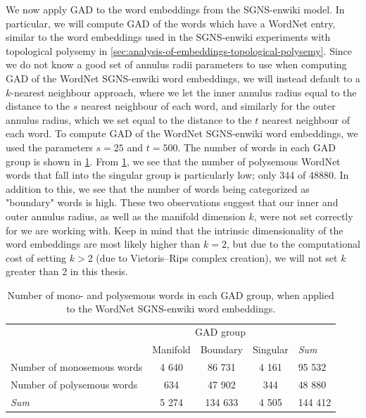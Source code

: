 We now apply GAD to the word embeddings from the SGNS-enwiki model. In particular, we will compute GAD of the words which have a WordNet entry, similar to the word embeddings used in the SGNS-enwiki experiments with topological polysemy in \cref{sec:analysis-of-embeddings-topological-polysemy}. Since we do not know a good set of annulus radii parameters to use when computing GAD of the WordNet SGNS-enwiki word embeddings, we will instead default to a $k$-nearest neighbour approach, where we let the inner annulus radius equal to the distance to the $s$ nearest neighbour of each word, and similarly for the outer annulus radius, which we set equal to the distance to the $t$ nearest neighbour of each word. To compute GAD of the WordNet SGNS-enwiki word embeddings, we used the parameters $s=25$ and $t=500$. The number of words in each GAD group is shown in \cref{table:number-of-words-gad-polysemous-sgns-enwiki-wordnet}. From \cref{table:number-of-words-gad-polysemous-sgns-enwiki-wordnet}, we see that the number of polysemous WordNet words that fall into the singular group is particularly low; only 344 of 48880. In addition to this, we see that the number of words being categorized as "boundary" words is high. These two observations suggest that our inner and outer annulus radius, as well as the manifold dimension $k$, were not set correctly for we are working with. Keep in mind that the intrinsic dimensionality of the word embeddings are most likely higher than $k=2$, but due to the computational cost of setting $k > 2$ (due to Vietoris–Rips complex creation), we will not set $k$ greater than 2 in this thesis.
\begin{table}[H]
    \centering
    \begin{tabular}{@{}lcccl@{}}
    \toprule
    \multicolumn{1}{c}{}       & \multicolumn{3}{c}{GAD group}  & \multicolumn{1}{l}{} \\ \cmidrule(lr){2-4}
    \multicolumn{1}{c}{}       & Manifold & Boundary & Singular & \textit{Sum}                  \\ \midrule
    \trcolor Number of monosemous words            & 4 640     & 86 731    & 4 161     & 95 532                \\
    Number of polysemous words & 634      & 47 902    & 344      & 48 880                \\ \midrule
    \trcolor \textit{Sum}                        & 5 274     & 134 633   & 4 505     & 144 412 \\ \bottomrule
    \end{tabular}
    \caption{Number of mono- and polysemous words in each GAD group, when applied to the WordNet SGNS-enwiki word embeddings.}
    \label{table:number-of-words-gad-polysemous-sgns-enwiki-wordnet}
\end{table}

